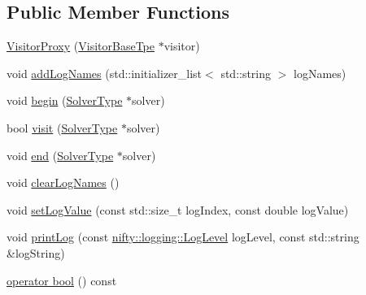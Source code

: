 \subsection*{Public Member Functions}
\begin{DoxyCompactItemize}
\item 
\hyperlink{classnifty_1_1graph_1_1optimization_1_1common_1_1VisitorProxy_ad066ff0bd69eaa48e846693d665b369d}{Visitor\+Proxy} (\hyperlink{classnifty_1_1graph_1_1optimization_1_1common_1_1VisitorProxy_abeeba329f198f6a6f05f9af13011e7d2}{Visitor\+Base\+Tpe} $\ast$visitor)
\item 
void \hyperlink{classnifty_1_1graph_1_1optimization_1_1common_1_1VisitorProxy_adf5c63d596e662d1a5c35e167912c27e}{add\+Log\+Names} (std\+::initializer\+\_\+list$<$ std\+::string $>$ log\+Names)
\item 
void \hyperlink{classnifty_1_1graph_1_1optimization_1_1common_1_1VisitorProxy_aa753fee7dfe837b8f168a954ad994128}{begin} (\hyperlink{classnifty_1_1graph_1_1optimization_1_1common_1_1VisitorProxy_a6728a2e754965cff1d6f4dab62aa642e}{Solver\+Type} $\ast$solver)
\item 
bool \hyperlink{classnifty_1_1graph_1_1optimization_1_1common_1_1VisitorProxy_a3981609a88d96a9b13e59a9db2470057}{visit} (\hyperlink{classnifty_1_1graph_1_1optimization_1_1common_1_1VisitorProxy_a6728a2e754965cff1d6f4dab62aa642e}{Solver\+Type} $\ast$solver)
\item 
void \hyperlink{classnifty_1_1graph_1_1optimization_1_1common_1_1VisitorProxy_a9340aa683f5445d064b422c88a7d9233}{end} (\hyperlink{classnifty_1_1graph_1_1optimization_1_1common_1_1VisitorProxy_a6728a2e754965cff1d6f4dab62aa642e}{Solver\+Type} $\ast$solver)
\item 
void \hyperlink{classnifty_1_1graph_1_1optimization_1_1common_1_1VisitorProxy_ae1d55cb7f69c980f212cd730ccee3475}{clear\+Log\+Names} ()
\item 
void \hyperlink{classnifty_1_1graph_1_1optimization_1_1common_1_1VisitorProxy_a3ba213d5b7998d8d531a7eab0c902463}{set\+Log\+Value} (const std\+::size\+\_\+t log\+Index, const double log\+Value)
\item 
void \hyperlink{classnifty_1_1graph_1_1optimization_1_1common_1_1VisitorProxy_aa010b211518a2ff8fe8d42a1cea873fc}{print\+Log} (const \hyperlink{namespacenifty_1_1logging_a3385625f9a0dbb17f70c47d3fca2f64d}{nifty\+::logging\+::\+Log\+Level} log\+Level, const std\+::string \&log\+String)
\item 
\hyperlink{classnifty_1_1graph_1_1optimization_1_1common_1_1VisitorProxy_a6bfb84aeddc78f6dd7d73e26872d5af6}{operator bool} () const 
\end{DoxyCompactItemize}


